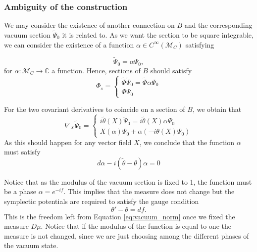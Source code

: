 \documentclass[12pt]{article}%
\begin{document}
\subsubsection{Ambiguity of the construction}
\label{sec:Ambiguity}

We may consider the existence of another connection on $B$ and the corresponding vacuum section $\tilde \Psi_0$ it is related to. As we want the section to be square integrable, we can consider the existence of a function $\alpha\in C^\infty(\mathcal{M}_C)$ satisfying

\begin{equation}
\label{eq:newvacuum}
\tilde \Psi_0=\alpha \Psi_0,
\end{equation}
for $\alpha:\mathcal{M}_C\to \mathbb{C}$ a function. Hence, sections of $B$ should satisfy
\begin{equation}
\label{eq:change-alpha}
\Phi_s= 
\begin{cases} 
    \tilde \Phi \tilde \Psi_0=\tilde \Phi \alpha\Psi_0 \\
    \Phi \Psi_0
\end{cases}
\end{equation}

For the two covariant derivatives to coincide on a section of $B$, we obtain that
\begin{equation}
\label{eq:vacua}
\nabla_X \tilde \Psi_0=
\begin{cases} 
  i\tilde \theta (X) \tilde \Psi_0 = i\tilde \theta (X)  \alpha \Psi_0  \\ 
  X(\alpha)\Psi_0+ \alpha(-i\theta(X) \Psi_0)
\end{cases}
\end{equation}
As this should happen for any vector field $X$, we conclude that the function $\alpha$ must satisfy
\begin{equation}
\label{eq:alphacondition}
d\alpha-i( \tilde \theta-\theta)\alpha=0
\end{equation}

Notice that as the modulus of the vacuum section is fixed to 1,  the function must be a phase $\alpha=e^{-if}$. This implies that the measure does not change but the symplectic potentials are required to satisfy the gauge condition
\begin{equation}
\label{eq:gauge}
\theta'-\theta=df.
\end{equation}
This is the freedom left from Equation \eqref{eq:vacuum_norm} once we fixed the measure $D\mu$. 
Notice that if the modulus of the function is equal to one the measure is not changed, since we are just choosing among the different phases of the vacuum state.
\end{document}
